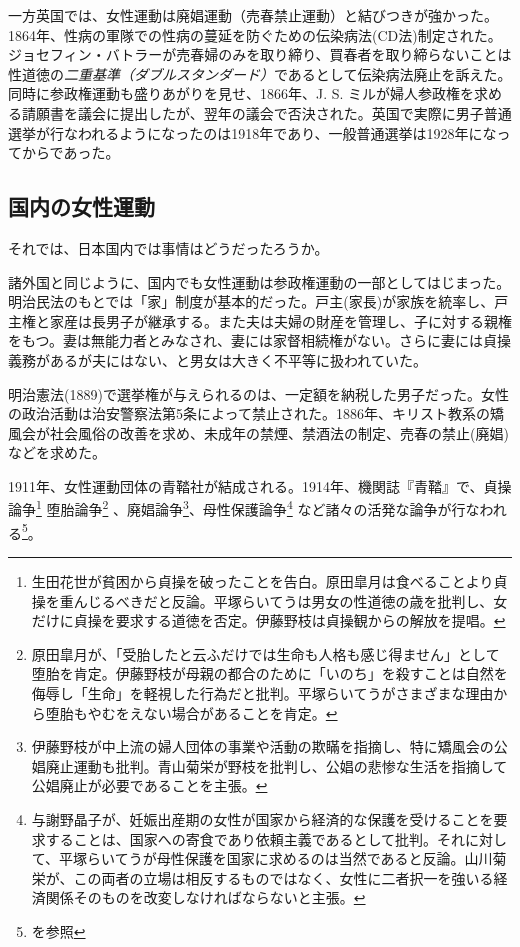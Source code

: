 \documentclass[dvipdfmx,uplatex]{jsarticle}
\begin{document}
一方英国では、女性運動は廃娼運動（売春禁止運動）と結びつきが強かった。1864年、性病の軍隊での性病の蔓延を防ぐための伝染病法(CD法)制定された。ジョセフィン・バトラーが売春婦のみを取り締り、買春者を取り締らないことは性道徳の\emph{二重基準（ダブルスタンダード）}であるとして伝染病法廃止を訴えた。同時に参政権運動も盛りあがりを見せ、1866年、J. S. ミルが婦人参政権を求める請願書を議会に提出したが、翌年の議会で否決された。英国で実際に男子普通選挙が行なわれるようになったのは1918年であり、一般普通選挙は1928年になってからであった。






\subsection{国内の女性運動}

それでは、日本国内では事情はどうだったろうか。

諸外国と同じように、国内でも女性運動は参政権運動の一部としてはじまった。明治民法のもとでは「家」制度が基本的だった。戸主(家長)が家族を統率し、戸主権と家産は長男子が継承する。また夫は夫婦の財産を管理し、子に対する親権をもつ。妻は無能力者とみなされ、妻には家督相続権がない。さらに妻には貞操義務があるが夫にはない、と男女は大きく不平等に扱われていた。

明治憲法(1889)で選挙権が与えられるのは、一定額を納税した男子だった。女性の政治活動は治安警察法第5条によって禁止された。1886年、キリスト教系の矯風会が社会風俗の改善を求め、未成年の禁煙、禁酒法の制定、売春の禁止(廃娼)などを求めた。

1911年、女性運動団体の青鞜社が結成される。1914年、機関誌『青鞜』で、貞操論争\footnote{生田花世が貧困から貞操を破ったことを告白。原田皐月は食べることより貞操を重んじるべきだと反論。平塚らいてうは男女の性道徳の歳を批判し、女だけに貞操を要求する道徳を否定。伊藤野枝は貞操観からの解放を提唱。} 堕胎論争\footnote{原田皐月が、「受胎したと云ふだけでは生命も人格も感じ得ません」として堕胎を肯定。伊藤野枝が母親の都合のために「いのち」を殺すことは自然を侮辱し「生命」を軽視した行為だと批判。平塚らいてうがさまざまな理由から堕胎もやむをえない場合があることを肯定。} 、廃娼論争\footnote{伊藤野枝が中上流の婦人団体の事業や活動の欺瞞を指摘し、特に矯風会の公娼廃止運動も批判。青山菊栄が野枝を批判し、公娼の悲惨な生活を指摘して公娼廃止が必要であることを主張。}、母性保護論争\footnote{与謝野晶子が、妊娠出産期の女性が国家から経済的な保護を受けることを要求することは、国家への寄食であり依頼主義であるとして批判。それに対して、平塚らいてうが母性保護を国家に求めるのは当然であると反論。山川菊栄が、この両者の立場は相反するものではなく、女性に二者択一を強いる経済関係そのものを改変しなければならないと主張。} など諸々の活発な論争が行なわれる\footnote{\citet{新フェミニズム批評の会98:青鞜を読む}を参照}。
\end{document}
